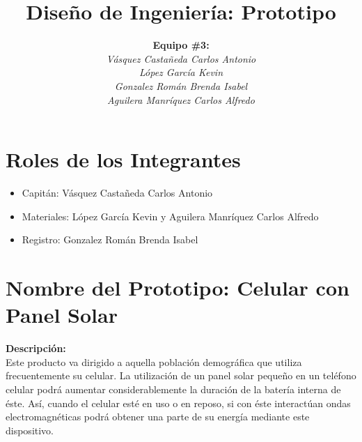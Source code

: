 \documentclass[letterpaper]{article}
\title{\textbf{Diseño de Ingeniería: Prototipo}}
\author{\textbf{Equipo \#3:}\\
\footnotesize {\textit{Vásquez Castañeda Carlos Antonio}}\\
\footnotesize {\textit{López García Kevin}}\\
\footnotesize {\textit{Gonzalez Román Brenda Isabel}}\\
\footnotesize {\textit{Aguilera Manríquez Carlos Alfredo}}\\
}
\date{}
\begin{document}
\maketitle

\section*{Roles de los Integrantes}
\begin{itemize}
	\item Capitán: Vásquez Castañeda Carlos Antonio
	\item Materiales: López García Kevin y Aguilera Manríquez Carlos Alfredo
	\item Registro: Gonzalez Román Brenda Isabel
\end{itemize}

\section*{Nombre del Prototipo: Celular con Panel Solar}
\textbf{Descripción:}\\
Este producto va dirigido a aquella población demográfica que utiliza frecuentemente su celular. La utilización de un panel solar pequeño en un teléfono celular podrá aumentar considerablemente la duración de la batería interna de éste. Así, cuando el celular esté en uso o en reposo, si con éste interactúan ondas electromagnéticas podrá obtener una parte de su energía mediante este dispositivo.
\renewcommand\refname{Referencias}
\printbibliography
\end{document}
